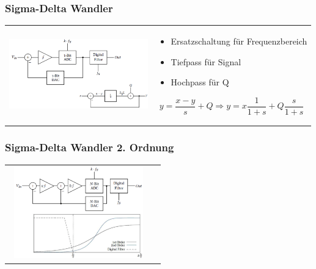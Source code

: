 \subsubsection{Sigma-Delta Wandler }
\begin{longtable}{ll}

\begin{minipage}{6cm}
\includegraphics[width=6cm, height = 4cm]{pictures/deltaSigma1}
\end{minipage}
&
\begin{minipage}{12cm}
\begin{itemize}
  \item Ersatzschaltung für Frequenzbereich
  \item Tiefpass für Signal
  \item Hochpass für Q
\end{itemize}
\begin{equation}
y=\frac{x-y}{s}+Q\Rightarrow y=x\frac{1}{1+s}+Q\frac{s}{1+s}
\end{equation}
\end{minipage}
\\

\end{longtable}

\subsubsection{Sigma-Delta Wandler 2. Ordnung }
\begin{longtable}{ll}

\begin{minipage}{6cm}
\includegraphics[width=6cm, height = 4cm]{pictures/deltaSigma2}
\end{minipage}
&
\begin{minipage}{12cm}

\end{minipage}
\\

\end{longtable}





